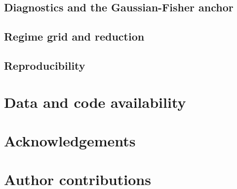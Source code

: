 \documentclass[9pt]{elife}
\begin{document}
\subsection*{Diagnostics and the Gaussian-Fisher anchor}
\subsection*{Regime grid and reduction}
\subsection*{Reproducibility}

\section*{Data and code availability}

\section*{Acknowledgements}

\section*{Author contributions}


\end{document}
